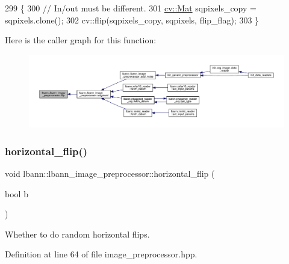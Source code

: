 \begin{DoxyCode}
299                                                                   \{
300   \textcolor{comment}{// In/out must be different.}
301   \hyperlink{base_8hpp_a68f11fdc31b62516cb310831bbe54d73}{cv::Mat} sqpixels\_copy = sqpixels.clone();
302   cv::flip(sqpixels\_copy, sqpixels, flip\_flag);
303 \}
\end{DoxyCode}
Here is the caller graph for this function\+:\nopagebreak
\begin{figure}[H]
\begin{center}
\leavevmode
\includegraphics[width=350pt]{classlbann_1_1lbann__image__preprocessor_a12d9f7056a5e68185ea0e85e14c17bcf_icgraph}
\end{center}
\end{figure}
\mbox{\label{classlbann_1_1lbann__image__preprocessor_a4ba2de0a781dfa0a2652ad4d777a241f}} 
\subsubsection{\texorpdfstring{horizontal\+\_\+flip()}{horizontal\_flip()}}
{\footnotesize\ttfamily void lbann\+::lbann\+\_\+image\+\_\+preprocessor\+::horizontal\+\_\+flip (\begin{DoxyParamCaption}\item[{bool}]{b }\end{DoxyParamCaption})\hspace{0.3cm}{\ttfamily [inline]}}

Whether to do random horizontal flips. 

Definition at line 64 of file image\+\_\+preprocessor.\+hpp.


